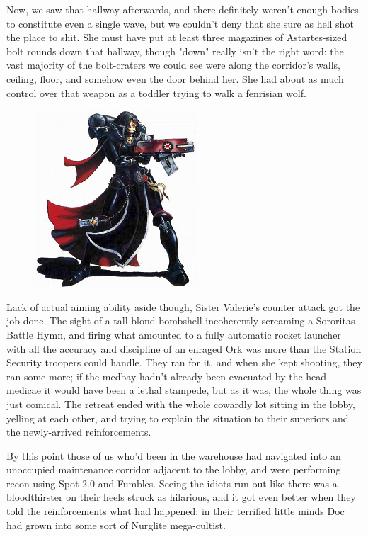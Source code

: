 Now, we saw that hallway afterwards, and there definitely weren't enough bodies to constitute even a single wave, but we couldn't deny that she sure as hell shot the place to shit. 
She must have put at least three magazines of Astartes-sized bolt rounds down that hallway, though "down" really isn't the right word: 
the vast majority of the bolt-craters we could see were along the corridor's walls, ceiling, floor, and somehow even the door behind her. 
She had about as much control over that weapon as a toddler trying to walk a fenrisian wolf.

\begin{figure}
	\begin{center}
		\includegraphics[width=\figwidth]{pics/14/37.png}
	\end{center}
\end{figure}
Lack of actual aiming ability aside though, Sister Valerie's counter attack got the job done. 
The sight of a tall blond bombshell incoherently screaming a Sororitas Battle Hymn, and firing what amounted to a fully automatic rocket launcher with all the accuracy and discipline of an enraged Ork was more than the Station Security troopers could handle. 
They ran for it, and when she kept shooting, they ran some more; 
if the medbay hadn't already been evacuated by the head medicae it would have been a lethal stampede, but as it was, the whole thing was just comical. 
The retreat ended with the whole cowardly lot sitting in the lobby, yelling at each other, and trying to explain the situation to their superiors and the newly-arrived reinforcements.

By this point those of us who'd been in the warehouse had navigated into an unoccupied maintenance corridor adjacent to the lobby, and were performing recon using Spot 2.0 and Fumbles. 
Seeing the idiots run out like there was a bloodthirster on their heels struck as hilarious, and it got even better when they told the reinforcements what had happened: 
in their terrified little minds Doc had grown into some sort of Nurglite mega-cultist. 


